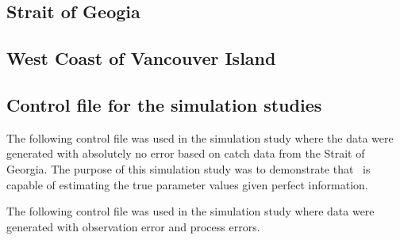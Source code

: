 \subsection{Strait of Geogia}
\begin{multicols}{2}

\tiny
\begin{alltt}
 
\end{alltt}
\normalsize

\tiny
\begin{alltt}
 
\end{alltt}
\normalsize

\end{multicols}
\clearpage

\subsection{West Coast of Vancouver Island}
\begin{multicols}{2}

\tiny
\begin{alltt}
 
\end{alltt}
\normalsize

\tiny
\begin{alltt}
 
\end{alltt}
\normalsize

\end{multicols}
\clearpage


\subsection{Control file for the simulation studies}
\begin{multicols}{2}
The following control file was used in the simulation study where the data were generated with absolutely no error based on catch data from the Strait of Georgia.  The purpose of this simulation study was  to demonstrate that \iscam\ is capable of estimating the true parameter values given perfect information.

\tiny
\begin{alltt}
 
\end{alltt}\label{TableSOGsimCtrl}
\normalsize

The following control file was used in the simulation study where data were generated with observation error and process errors.

\tiny
\begin{alltt}
 
\end{alltt}\label{TableSOGmcCtrl}
\normalsize

\end{multicols}




